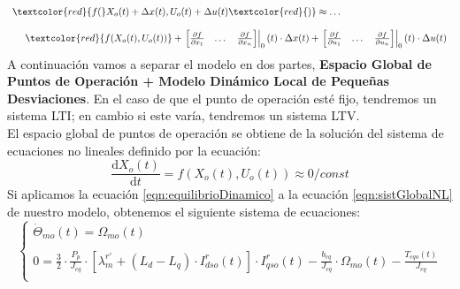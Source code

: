\documentclass[10pt]{article}
\begin{document}
\begin{enumerate}
	\begin{equation}
		\begin{array}{l}
			\textcolor{red}{f(} X_{o}(t)+\Delta x(t),U_{o}(t)+\Delta u(t) \textcolor{red}{)} \approx \dots
			\\
			\\
			\ \ \ \ 
			\textcolor{red}{f( X_{o}(t),U_{o}(t) )}+
			\left.\begin{matrix}
				\begin{bmatrix}
					\frac{\partial f}{\partial x_{1}} & \dots & \frac{\partial f}{\partial x_{n}}
				\end{bmatrix}
			\end{matrix}\right|_{0}(t)\cdot \Delta x(t)+
			\left.\begin{matrix}
				\begin{bmatrix}
					\frac{\partial f}{\partial u_{1}} & \dots & \frac{\partial f}{\partial u_{n}}
				\end{bmatrix}
			\end{matrix}\right|_{0}(t)\cdot \Delta u(t)
		\end{array}
	\end{equation}
	A continuación vamos a separar el modelo en dos partes, \textbf{Espacio Global de Puntos de Operación + Modelo Dinámico Local de Pequeñas Desviaciones}.
	En el caso de que el punto de operación esté fijo, tendremos un sistema LTI; en cambio si este varía, tendremos un sistema LTV.
	\\
	El espacio global de puntos de operación se obtiene de la solución del sistema de ecuaciones no lineales definido por la ecuación:
	\begin{equation}
		\label{eqn:equilibrioDinamico}
		\frac{\mathrm{d} X_{o}(t)}{\mathrm{d} t}=f(X_{o}(t),U_{o}(t))\approx 0/const
	\end{equation}
	Si aplicamos la ecuación \ref{eqn:equilibrioDinamico} a la ecuación \ref{eqn:sistGlobalNL} de nuestro modelo, obtenemos el siguiente sistema de ecuaciones:
	\begin{equation}
		\label{eqn:equilibrioDinamicoSistema}
		\begin{cases}
			\dot{\Theta}_{mo}(t)=\Omega_{mo}(t)
			\\
			\\
			0=\frac{3}{2} \cdot \frac{ P_{p}}{J_{eq}}\cdot \left [ \lambda_{m}^{r'}+\left ( L_{d}-L_{q} \right )\cdot I_{dso}^{r} \left ( t \right ) \right ] \cdot I_{qso}^{r}\left ( t \right )-\frac{b_{eq}}{J_{eq}}\cdot \Omega_{mo}\left ( t \right )-\frac{T_{eqo}(t)}{J_{eq}}
			\\

\end{cases}
\end{equation}
\end{enumerate}
\end{document}
